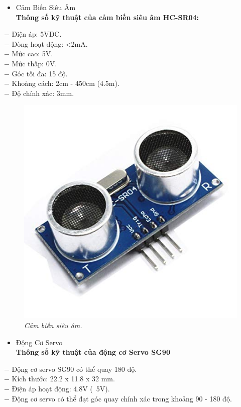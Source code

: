 \documentclass[12pt,a4paper]{article}
\begin{document}
\newpage
\begin{itemize}
    \item Cảm Biến Siêu Âm\\
    \textbf{Thông số kỹ thuật của cảm biến siêu âm HC-SR04:}
\end{itemize}
$-$ Điện áp: 5VDC.\\
$-$ Dòng hoạt động: <2mA.\\
$-$ Mức cao: 5V.\\
$-$ Mức thấp: 0V.\\
$-$ Góc tối đa: 15 độ.\\
$-$ Khoảng cách: 2cm - 450cm (4.5m).\\
$-$ Độ chính xác: 3mm.
\begin{figure}[ht!]
    \centering
    \includegraphics[scale=0.5]{hinh 3.jpg}
    \caption{\textit{Cảm biến siêu âm.}}
    \label{fig3}
\end{figure}
\newpage
\begin{itemize}
    \item Động Cơ Servo\\
    \textbf{Thông số kỹ thuật của động cơ Servo SG90}
\end{itemize}
$-$ Động cơ servo SG90 có thể quay 180 độ.\\
$-$ Kích thước: 22.2 x 11.8 x 32 mm.\\
$-$ Điện áp hoạt động: 4.8V (~5V).\\
$-$ Động cơ servo có thể đạt góc quay chính xác trong khoảng 90 - 180 độ.\\
\end{document}
